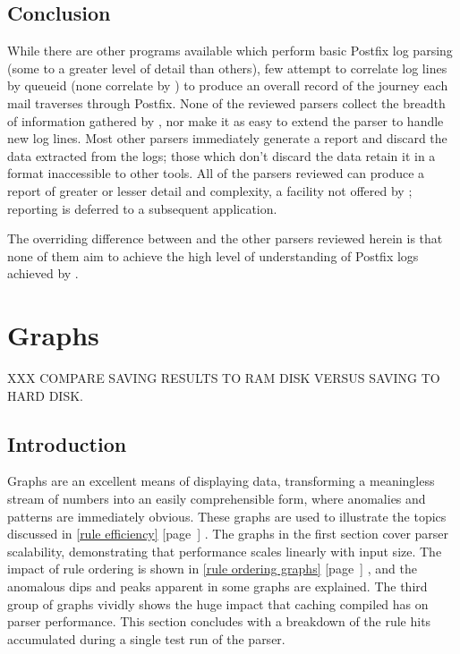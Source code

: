 \documentclass[a4paper,12pt,draft]{article}
\newcommand{\parsername}{\PLP{}}
\newcommand{\refwithpage}[1]{%
    \empty{}\ref{#1} [page~\pageref{#1}]%
}
\newcommand{\sectionref}[1]{%
    \textsection{}\refwithpage{#1}%
}
\begin{document}
\subsection{Conclusion}

While there are other programs available which perform basic Postfix log
parsing (some to a greater level of detail than others), few attempt to
correlate log lines by queueid (none correlate by \pid{}) to produce an
overall record of the journey each mail traverses through Postfix.  None of
the reviewed parsers collect the breadth of information gathered by
\parsername{}, nor make it as easy to extend the parser to handle new log
lines.  Most other parsers immediately generate a report and discard the
data extracted from the logs; those which don't discard the data retain it
in a format inaccessible to other tools.  All of the parsers reviewed can
produce a report of greater or lesser detail and complexity, a facility not
offered by \parsername{}; reporting is deferred to a subsequent
application.

The overriding difference between \parsername{} and the other parsers
reviewed herein is that none of them aim to achieve the high level of
understanding of Postfix logs achieved by \parsername{}.




\label{bibliography}

\section{Graphs}

\label{graphs}

XXX COMPARE SAVING RESULTS TO RAM DISK VERSUS SAVING TO HARD DISK\@.

\renewcommand{\figurename}{Graph}

\subsection{Introduction}

Graphs are an excellent means of displaying data, transforming a
meaningless stream of numbers into an easily comprehensible form, where
anomalies and patterns are immediately obvious.  These graphs are used to
illustrate the topics discussed in \sectionref{rule efficiency}.  The
graphs in the first section cover parser scalability, demonstrating that
performance scales linearly with input size.  The impact of rule ordering
is shown in \sectionref{rule ordering graphs}, and the anomalous dips and
peaks apparent in some graphs are explained.  The third group of graphs
vividly shows the huge impact that caching compiled \regexes{} has on
parser performance.  This section concludes with a breakdown of the rule
hits accumulated during a single test run of the parser.
\end{document}
